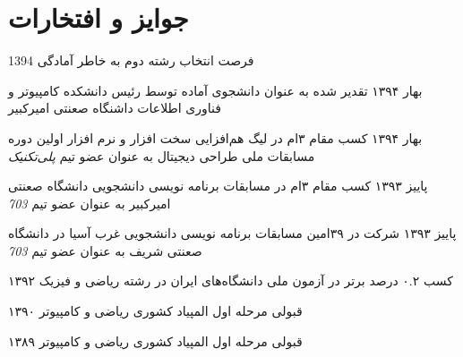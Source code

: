\documentclass[]{friggeri-cv-fa} %
\begin{document}
\section{جوایز و افتخارات}

\begin{entrylist}


	\entry
	{1394}
	{{\normalfont فرصت انتخاب} \textcolor{TextGreen}{رشته دوم} {\normalfont به خاطر آمادگی}}
	{}
	{}


	\entry
	{بهار ۱۳۹۴}
	{\normalfont تقدیر شده به عنوان دانشجوی آماده توسط رئیس دانشکده کامپیوتر و فناوری اطلاعات داشنگاه صعنتی امیرکبیر}
	{}
	{}


	\entry
	{بهار ۱۳۹۴}
	{{\normalfont کسب مقام} \textcolor{TextYellow}{۳ام} {\normalfont در لیگ هم‌افزایی سخت افزار و نرم افزار اولین دوره مسابقات ملی طراحی دیجیتال به عنوان عضو تیم  \emph{پلی‌تکنیک}}}
	{}
	{}


	\entry
	{پاییز ۱۳۹۳}
	{{\normalfont کسب مقام} \textcolor{UniBlue}{۳ام} {\normalfont در مسابقات برنامه نویسی دانشجویی دانشگاه صعنتی امیرکبیر به عنوان عضو تیم   \emph{703}}}
	{}
	{}


	\entry
	{پاییز ۱۳۹۳}
	{\normalfont شرکت در ۳۹امین مسابقات برنامه نویسی دانشجویی غرب آسیا در دانشگاه صعنتی شریف به عنوان عضو تیم  \emph{703}}
	{}
	{}


	\entry
	{۱۳۹۲}
	{\normalfont کسب ۰.۲ درصد برتر در آزمون ملی دانشگاه‌های ایران در رشته ریاضی و فیزیک}
	{}
	{}


	\entry
	{۱۳۹۰}
	{{\normalfont قبولی} \textcolor{TextOrange}{مرحله اول} {\normalfont المپیاد کشوری ریاضی و کامپیوتر}}
	{}
	{}


	\entry
	{۱۳۸۹}
	{{\normalfont قبولی} \textcolor{TextOrange}{مرحله اول} {\normalfont المپیاد کشوری ریاضی و کامپیوتر}}
	{}
	{}



\end{entrylist}
\end{document}
